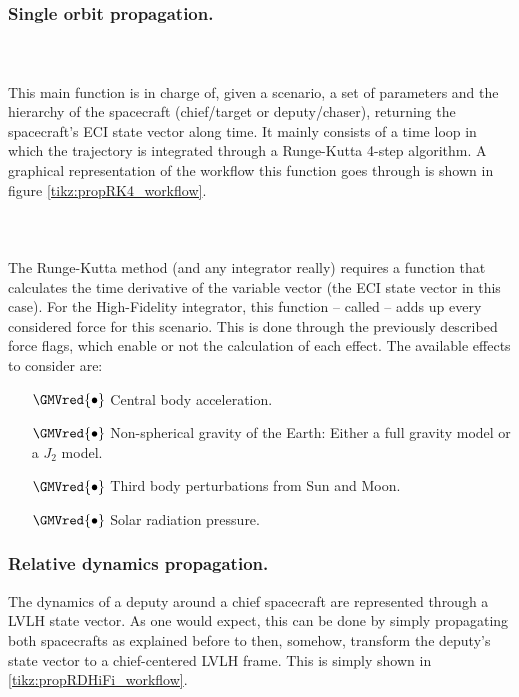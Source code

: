 		\subsubsection{Single orbit propagation.}
		\paragraph{ \\}
		\indent This main function is in charge of, given a scenario, a set of parameters and the hierarchy of the spacecraft (chief/target or deputy/chaser), returning the spacecraft's ECI state vector along time. It mainly consists of a time loop in which the trajectory is integrated through a Runge-Kutta 4-step algorithm. A graphical representation of the workflow this function goes through is shown in figure \ref{tikz:propRK4_workflow}.
		
		\paragraph{  \\} 	
		\indent The Runge-Kutta method (and any integrator really) requires a function that calculates the time derivative of the variable vector (the ECI state vector in this case). For the High-Fidelity integrator, this function -- called  -- adds up every considered force for this scenario. This is done through the previously described force flags, which enable or not the calculation of each effect. The available effects to consider are:
		\begin{itemize}
		\item[$\GMVred{\bullet}$] Central body acceleration. 
		\item[$\GMVred{\bullet}$]  Non-spherical gravity of the Earth: Either a full gravity model or a $J_2$ model.
		\item[$\GMVred{\bullet}$]  Third body perturbations from Sun and Moon.
		\item[$\GMVred{\bullet}$]  Solar radiation pressure.
		\end{itemize}
		\subsubsection{Relative dynamics propagation.}
		\indent The dynamics of a deputy around a chief spacecraft are represented through a LVLH state vector. As one would expect, this can be done by simply propagating both spacecrafts as explained before to then, somehow, transform the deputy's state vector to a chief-centered LVLH frame. This is simply shown in \ref{tikz:propRDHiFi_workflow}.
		
